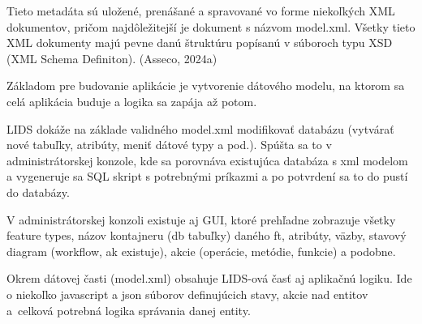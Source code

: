 Tieto metadáta sú uložené, prenášané a spravované vo forme niekoľkých XML dokumentov, pričom najdôležitejší je dokument s názvom model.xml. Všet\-ky tieto XML dokumenty majú pevne danú štruktúru popísanú v súboroch typu XSD (XML Schema Definiton). \scr(Asseco, 2024a)

%

Základom pre budovanie aplikácie je vytvorenie dátového modelu, na ktorom sa celá aplikácia buduje a logika sa zapája až potom. 

LIDS dokáže na základe validného model.xml modifikovať databázu (vytvárať nové tabuľky, atribúty, meniť dátové typy a pod.). Spúšta sa to v administrátorskej konzole, kde sa porovnáva existujúca databáza s xml modelom a vygeneruje sa SQL skript s potrebnými príkazmi a po potvrdení sa to do pustí do databázy.

V administrátorskej konzoli existuje aj GUI, ktoré prehľadne zobrazuje všetky feature types, názov kontajneru (db tabuľky) daného ft, atribúty, väzby, stavový diagram (workflow, ak existuje), akcie (operácie, metódie, funkcie) a podobne. 

Okrem dátovej časti (model.xml) obsahuje LIDS-ová časť aj aplikačnú logiku. Ide o niekoľko javascript a json súborov definujúcich stavy, akcie nad entitov a~celková potrebná logika správania danej entity.


